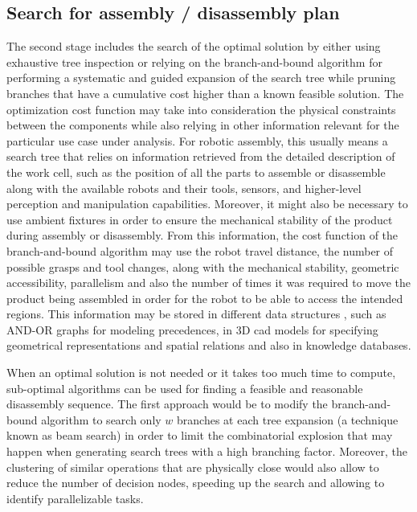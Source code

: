 \subsection{Search for assembly / disassembly plan}

The second stage includes the search of the optimal solution by either using exhaustive tree inspection or relying on the branch-and-bound algorithm \cite{Thomas2011,Thomas2015} for performing a systematic and guided expansion of the search tree while pruning branches that have a cumulative cost higher than a known feasible solution. The optimization cost function may take into consideration the physical constraints between the components while also relying in other information relevant for the particular use case under analysis. For robotic assembly, this usually means a search tree that relies on information retrieved from the detailed description of the work cell, such as the position of all the parts to assemble or disassemble along with the available robots and their tools, sensors, and higher-level perception and manipulation capabilities. Moreover, it might also be necessary to use ambient fixtures in order to ensure the mechanical stability of the product during assembly or disassembly. From this information, the cost function of the branch-and-bound algorithm may use the robot travel distance, the number of possible grasps and tool changes, along with the mechanical stability, geometric accessibility, parallelism and also the number of times it was required to move the product being assembled in order for the robot to be able to access the intended regions. This information may be stored in different data structures \cite{Thomas2001}, such as AND-OR graphs for modeling precedences, in 3D \gls{cad} models for specifying geometrical representations and spatial relations and also in knowledge databases.

When an optimal solution is not needed or it takes too much time to compute, sub-optimal algorithms can be used for finding a feasible and reasonable disassembly sequence. The first approach would be to modify the branch-and-bound algorithm \cite{Zhang2010} to search only $w$ branches at each tree expansion (a technique known as beam search) in order to limit the combinatorial explosion that may happen when generating search trees with a high branching factor. Moreover, the clustering of similar operations that are physically close would also allow to reduce the number of decision nodes, speeding up the search and allowing to identify parallelizable tasks.

